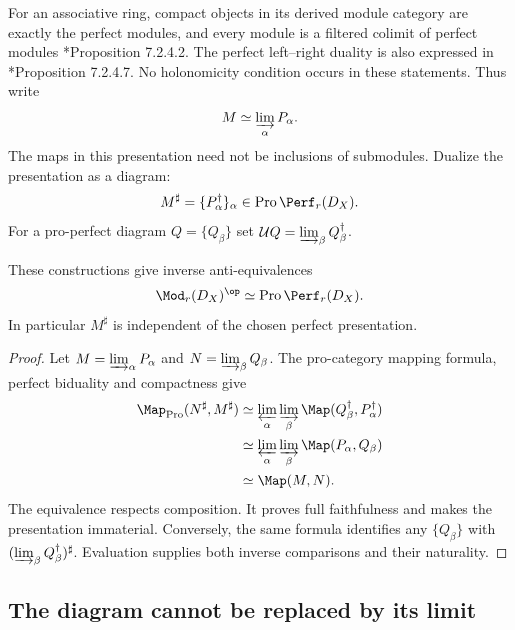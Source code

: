 For an associative ring, compact objects in its derived module
category are exactly the perfect modules, and every module is a
filtered colimit of perfect modules
\cite{LurieHA}*{Proposition 7.2.4.2}. The perfect left--right
duality is also expressed in \cite{LurieHA}*{Proposition 7.2.4.7}.
No holonomicity condition occurs in these statements. Thus write
\[
 M\simeq\varinjlim_\alpha P_\alpha.
\]
The maps in this presentation need not be inclusions of submodules.
Dualize the presentation as a diagram:
\begin{equation}\label{cyjets:eq:sharp}
 M^\sharp=\{P_\alpha^\dagger\}_\alpha
             \in\operatorname{Pro}\Perf_r(D_X).
\end{equation}
For a pro-perfect diagram $Q=\{Q_\beta\}$ set
$\mathcal UQ=\varinjlim_\beta Q_\beta^\dagger$.

\begin{theorem}\label{cyjets:thm:pro}
These constructions give inverse anti-equivalences
\begin{equation}\label{cyjets:eq:pro-equivalence}
 \Mod_r(D_X)^{\op}\simeq\operatorname{Pro}\Perf_r(D_X).
\end{equation}
In particular $M^\sharp$ is independent of the chosen perfect
presentation.
\end{theorem}
\begin{proof}
Let $M=\varinjlim_\alpha P_\alpha$ and
$N=\varinjlim_\beta Q_\beta$. The pro-category mapping formula,
perfect biduality and compactness give
\begin{align*}
 \Map_{\operatorname{Pro}}(N^\sharp,M^\sharp)
 &\simeq\varprojlim_\alpha\varinjlim_\beta
                   \Map(Q_\beta^\dagger,P_\alpha^\dagger)\\
 &\simeq\varprojlim_\alpha\varinjlim_\beta
                   \Map(P_\alpha,Q_\beta)\\
 &\simeq\Map(M,N).
\end{align*}
The equivalence respects composition. It proves full faithfulness
and makes the presentation immaterial. Conversely, the same formula
identifies any $\{Q_\beta\}$ with
$(\varinjlim_\beta Q_\beta^\dagger)^\sharp$. Evaluation supplies
both inverse comparisons and their naturality.
\end{proof}

\subsection{The diagram cannot be replaced by its limit}

